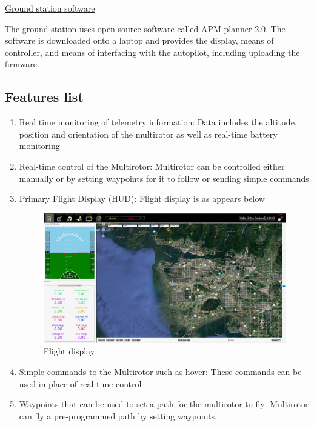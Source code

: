 \underline{Ground station software}

The ground station uses open source software called APM planner 2.0. The software is downloaded onto a laptop and provides the display, means of controller, and means of interfacing with the autopilot, including uploading the firmware.

\subsection{Features list}

\begin{enumerate}

    \item Real time monitoring of telemetry information: Data includes the altitude, position and orientation of the multirotor as well as real-time battery monitoring
    
    \item Real-time control of the Multirotor: Multirotor can be controlled either manually or by setting waypoints for it to follow or sending simple commands
    
    \item Primary Flight Display (HUD): Flight display is as appears below
    
\begin{figure}[H]
	\centering
	\includegraphics[width=15cm]{img/HUD.png}
	\caption{Flight display}
	\label{flight display}
	\end{figure}

    \item Simple commands to the Multirotor such as hover: These commands can be used in place of real-time control
    
    \item Waypoints that can be used to set a path for the multirotor to fly: Multirotor can fly a pre-programmed path by setting waypoints.
    
\end{enumerate}

